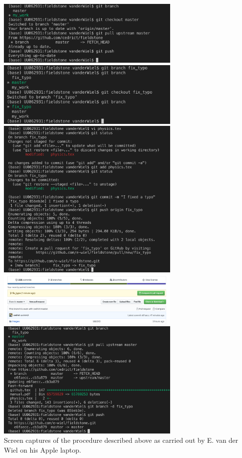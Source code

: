 \newpage
\begin{center}
\includegraphics[width=9cm]{images/github/1}\\
\includegraphics[width=9cm]{images/github/2}\\
\includegraphics[width=9cm]{images/github/3}\\
\includegraphics[width=9cm]{images/github/4}\\
\includegraphics[width=9cm]{images/github/6}\\
{\captionfont Screen captures of the procedure described above as 
carried out by E. van der Wiel on his Apple laptop.}
\end{center}




